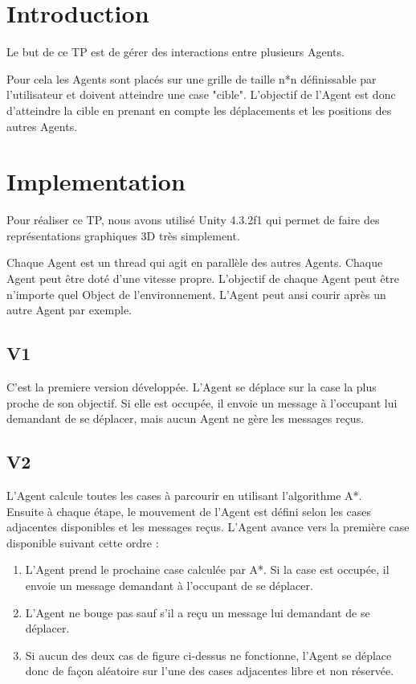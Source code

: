 \documentclass[11pt]{article}
\author{\fontsize{14}{14}{\bf Aurélien CHEMIER, Arnaud DUHAMEL, Maëlyss FARGES}}
\title{\fontsize{16}{16}{{\bf TP 1\\ Interaction multi-Agents}}}
\date{\fontsize{11}{11}{Université Lyon 1 - 2014}}
\begin{document}
  \thispagestyle{empty}
  \maketitle
  \tableofcontents
  
  
  \newpage
  
  \section{Introduction}
  
  Le but de ce TP est de gérer des interactions entre plusieurs Agents.
  
  Pour cela les Agents sont placés sur une grille de taille n*n définissable par l'utilisateur et doivent atteindre une case "cible".
  L'objectif de l'Agent est donc d'atteindre la cible en prenant en compte les déplacements et les positions des autres Agents.
  
  \section{Implementation}
  
  Pour réaliser ce TP, nous avons utilisé Unity 4.3.2f1 qui permet de faire des représentations graphiques 3D très simplement.
  
  Chaque Agent est un thread qui agit en parallèle des autres Agents.
  Chaque Agent peut être doté d'une vitesse propre. 
  L'objectif de chaque Agent peut être n'importe quel Object de l'environnement. 
  L'Agent peut ansi courir après un autre Agent par exemple.
  
  \subsection{V1}
  C'est la  premiere version développée.
  L'Agent se déplace sur la case la plus proche de son objectif. 
  Si elle est occupée, il envoie un message à l'occupant lui demandant de se déplacer, mais aucun Agent ne gère les messages reçus.
  
  \subsection{V2}
  
  L'Agent calcule toutes les cases à parcourir en utilisant l'algorithme A*.\\
  Ensuite à chaque étape, le mouvement de l'Agent est défini selon les cases adjacentes disponibles et les messages reçus. 
  L'Agent avance vers la première case disponible suivant cette ordre :
  \begin{enumerate}
  \item L'Agent prend le prochaine case calculée par A*. Si la case est occupée, il envoie un message demandant à l'occupant de se déplacer.
  \item	L'Agent ne bouge pas sauf s'il a reçu un message lui demandant de se déplacer.
  \item Si aucun des deux cas de figure ci-dessus ne fonctionne, 
  l'Agent se déplace donc de façon aléatoire sur l'une des cases adjacentes libre et non réservée.
  \end{enumerate}
  
\end{document}
